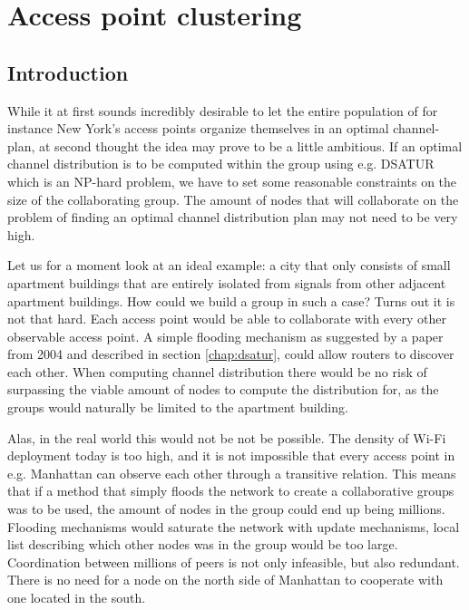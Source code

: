 \chapter{Access point clustering} \label{chap:clustering}



\section{Introduction}
While it at first sounds incredibly desirable to let the entire population of for instance New York's access points organize themselves in an optimal channel-plan,
at second thought the idea may prove to be a little ambitious. If an optimal channel distribution is to be computed within the group using e.g. DSATUR \cite{Brelaz} which
is an NP-hard problem, we have to set some reasonable constraints on the size of the collaborating group. The amount of nodes that will collaborate on the problem of finding an optimal channel distribution plan may not need to be very high.

Let us for a moment look at an ideal example: a city that only consists of small apartment buildings that are entirely isolated from signals from other adjacent apartment buildings.
How could we build a group in such a case? Turns out it is not that hard. Each access point would be able to collaborate with every other observable access point. A simple flooding mechanism
as suggested by a paper from 2004 \cite{mahonen} and described in section \ref{chap:dsatur}, could allow routers to discover each other. When computing channel distribution there would be no risk of surpassing the viable amount of nodes to compute the distribution for, as the groups would naturally be limited to the apartment building.

Alas, in the real world this would not be not be possible. The density of Wi-Fi deployment today is too high, and it is not impossible that every access point in e.g. Manhattan can observe each other through a transitive relation. This means that if a method that simply floods the network to create a collaborative groups was to be used, the amount of nodes in the group could end up being millions.
Flooding mechanisms would saturate the network with update mechanisms, local list describing which other nodes was in the group would be too large. Coordination between millions of peers
is not only infeasible, but also redundant. There is no need for a node on the north side of Manhattan to cooperate with one located in the south. 

